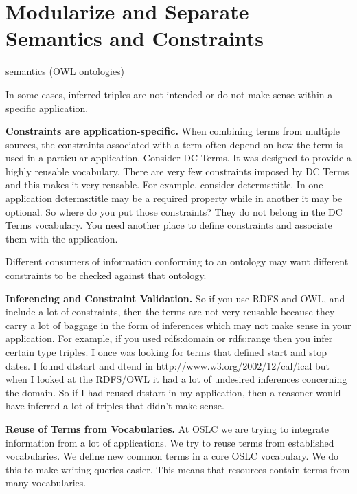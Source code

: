 \documentclass{llncs}
\begin{document}
\section{Modularize and Separate Semantics and Constraints}

semantics (OWL ontologies)

In some cases, inferred triples are not intended or do not make sense within a specific application.

\textbf{Constraints are application-specific.}
When combining terms from multiple sources, 
the constraints associated with a term often depend on how 
the term is used in a particular application. Consider DC Terms. It was 
designed to provide a highly reusable vocabulary. There are very few 
constraints imposed by DC Terms and this makes it very reusable. For 
example, consider dcterms:title. In one application dcterms:title may be a 
required property while in another it may be optional. So where do you put 
those constraints? They do not belong in the DC Terms vocabulary. You need 
another place to define constraints and associate them with the 
application. 

Different consumers of information conforming to an ontology may want
different constraints to be checked against that ontology.  

\textbf{Inferencing and Constraint Validation.}
So if you use RDFS and OWL, and include a lot of constraints, then the 
terms are not very reusable because they carry a lot of baggage in the 
form of inferences which may not make sense in your application. For 
example, if you used rdfs:domain or rdfs:range then you infer certain type 
triples. I once was looking for terms that defined start and stop dates. I 
found dtstart and dtend in http://www.w3.org/2002/12/cal/ical but when I 
looked at the RDFS/OWL it had a lot of undesired inferences concerning the 
domain. So if I had reused dtstart in my application, then a reasoner 
would have inferred a lot of triples that didn't make sense.

\textbf{Reuse of Terms from Vocabularies.}
At OSLC we are trying to integrate information from a lot of applications. 
We try to reuse terms from established vocabularies. We define new common 
terms in a core OSLC vocabulary. We do this to make writing queries 
easier. This means that resources contain terms from many vocabularies.

\end{document}
